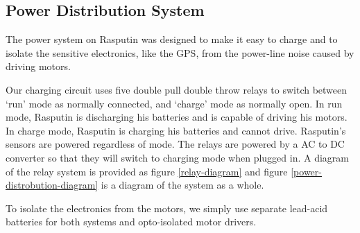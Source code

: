 \documentclass[master.tex]{subfiles}
\begin{document}

\subsection{Power Distribution System}
The power system on Rasputin was designed to make it easy to charge and to isolate the sensitive electronics, like the GPS, from the power-line noise caused by driving motors.

Our charging circuit uses five double pull double throw relays to switch between `run' mode as normally connected, and `charge' mode as normally open.
In run mode, Rasputin is discharging his batteries and is capable of driving his motors.
In charge mode, Rasputin is charging his batteries and cannot drive.
Rasputin's sensors are powered regardless of mode.
The relays are powered by a AC to DC converter so that they will switch to charging mode when plugged in.
A diagram of the relay system is provided as figure \ref{relay-diagram} and figure \ref{power-distrobution-diagram} is a diagram of the system as a whole.

To isolate the electronics from the motors, we simply use separate lead-acid batteries for both systems and opto-isolated motor drivers.

\end{document}
